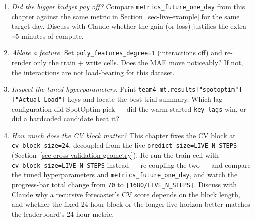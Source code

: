 \documentclass[
  english,
  letterpaper,
]{scrbook}
\providecommand{\tightlist}{%
  \setlength{\itemsep}{0pt}\setlength{\parskip}{0pt}}
\begin{document}
\begin{tcolorbox}[enhanced jigsaw, arc=.35mm, bottomrule=.15mm, bottomtitle=1mm, breakable, colback=white, colbacktitle=quarto-callout-tip-color!10!white, colframe=quarto-callout-tip-color-frame, coltitle=black, left=2mm, leftrule=.75mm, opacityback=0, opacitybacktitle=0.6, rightrule=.15mm, title=\textcolor{quarto-callout-tip-color}{\faLightbulb}\hspace{0.5em}{Exercises (with Claude)}, titlerule=0mm, toprule=.15mm, toptitle=1mm]

\begin{enumerate}
\def\labelenumi{\arabic{enumi}.}
\tightlist
\item
  \emph{Did the bigger budget pay off?} Compare
  \texttt{metrics\_future\_one\_day} from this chapter against the same
  metric in Section~\ref{sec-live-example} for the same target day.
  Discuss with Claude whether the gain (or loss) justifies the extra
  \textasciitilde5 minutes of compute.
\item
  \emph{Ablate a feature.} Set \texttt{poly\_features\_degree=1}
  (interactions off) and re-render only the train + write cells. Does
  the MAE move noticeably? If not, the interactions are not load-bearing
  for this dataset.
\item
  \emph{Inspect the tuned hyperparameters.} Print
  \texttt{team4\_mt.results{[}"spotoptim"{]}{[}"Actual\ Load"{]}} keys
  and locate the best-trial summary. Which lag configuration did
  SpotOptim pick --- did the warm-started \texttt{key\_lags} win, or did
  a hardcoded candidate beat it?
\item
  \emph{How much does the CV block matter?} This chapter fixes the CV
  block at \texttt{cv\_block\_size=24}, decoupled from the live
  \texttt{predict\_size=LIVE\_N\_STEPS}
  (Section~\ref{sec-cross-validation-geometry}). Re-run the train cell
  with \texttt{cv\_block\_size=LIVE\_N\_STEPS} instead --- re-coupling
  the two --- and compare the tuned hyperparameters and
  \texttt{metrics\_future\_one\_day}, and watch the progress-bar total
  change from \texttt{70} to \texttt{⌈1680/LIVE\_N\_STEPS⌉}. Discuss
  with Claude why a recursive forecaster's CV score depends on the block
  length, and whether the fixed 24-hour block or the longer live horizon
  better matches the leaderboard's 24-hour metric.
\end{enumerate}

\end{tcolorbox}

\end{document}
